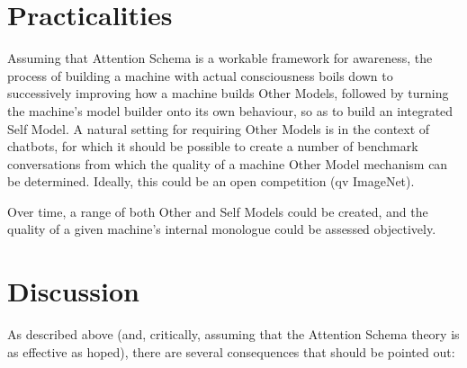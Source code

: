 \documentclass[citeauthoryear]{llncs}
\begin{document}

\section{Practicalities}


Assuming that Attention Schema is a workable framework for awareness,
the process of building a machine with actual consciousness boils down
to successively improving how a machine builds Other Models, 
followed by turning the machine's model builder onto its own behaviour,
so as to build an integrated Self Model.
% 
A natural setting for requiring Other Models is in the context of chatbots,
for which it should be possible to create a number of benchmark conversations 
from which the quality of a machine Other Model mechanism can be determined.  
Ideally, this could be an open competition (qv ImageNet).

Over time, a range of both Other and Self Models could be created, 
and the quality of a given machine's internal monologue could be assessed objectively.


\section{Discussion}

As described above (and, critically, assuming that the Attention Schema theory
is as effective as hoped), there are several consequences that should
be pointed out:
\end{document}

